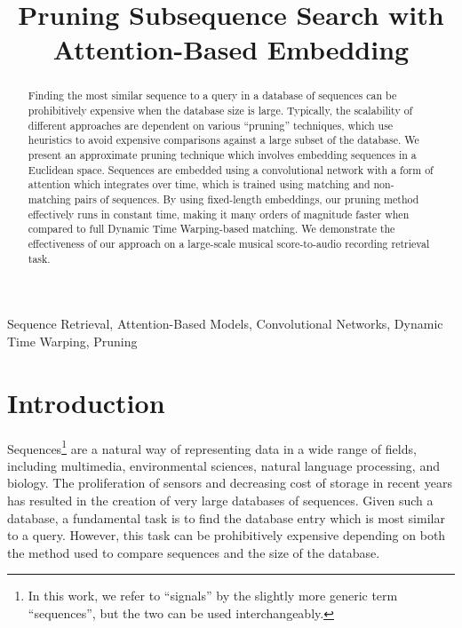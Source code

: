 \documentclass{article}
\title{Pruning Subsequence Search with Attention-Based Embedding}
\begin{document}
\maketitle

\begin{abstract}
Finding the most similar sequence to a query in a database of sequences can be prohibitively expensive when the database size is large.
Typically, the scalability of different approaches are dependent on various ``pruning'' techniques, which use heuristics to avoid expensive comparisons against a large subset of the database.
We present an approximate pruning technique which involves embedding sequences in a Euclidean space.
Sequences are embedded using a convolutional network with a form of attention which integrates over time, which is trained using matching and non-matching pairs of sequences.
By using fixed-length embeddings, our pruning method effectively runs in constant time, making it many orders of magnitude faster when compared to full Dynamic Time Warping-based matching.
We demonstrate the effectiveness of our approach on a large-scale musical score-to-audio recording retrieval task.
\end{abstract}

\begin{keywords}
Sequence Retrieval, Attention-Based Models, Convolutional Networks, Dynamic Time Warping, Pruning
\end{keywords}

\section{Introduction}
\label{sec:intro}

Sequences\footnote{In this work, we refer to ``signals'' by the slightly more generic term ``sequences'', but the two can be used interchangeably.} are a natural way of representing data in a wide range of fields, including multimedia, environmental sciences, natural language processing, and biology.
The proliferation of sensors and decreasing cost of storage in recent years has resulted in the creation of very large databases of sequences.
Given such a database, a fundamental task is to find the database entry which is most similar to a query.
However, this task can be prohibitively expensive depending on both the method used to compare sequences and the size of the database.
\end{document}

